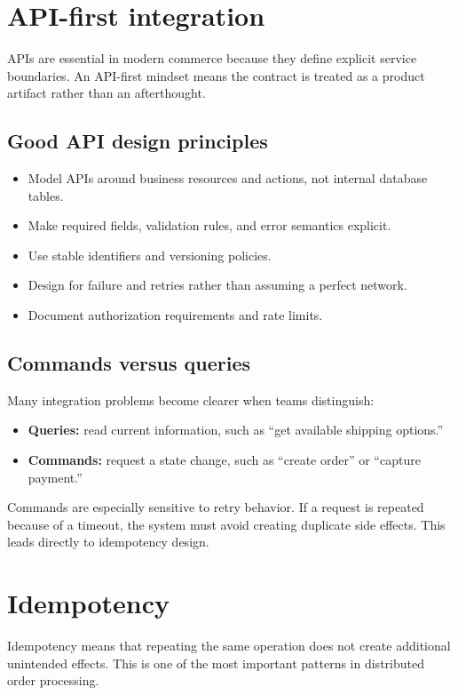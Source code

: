\section{API-first integration}
APIs are essential in modern commerce because they define explicit service boundaries.
An API-first mindset means the contract is treated as a product artifact rather than an afterthought.

\subsection{Good API design principles}
\begin{itemize}
  \item Model APIs around business resources and actions, not internal database tables.
  \item Make required fields, validation rules, and error semantics explicit.
  \item Use stable identifiers and versioning policies.
  \item Design for failure and retries rather than assuming a perfect network.
  \item Document authorization requirements and rate limits.
\end{itemize}

\subsection{Commands versus queries}
Many integration problems become clearer when teams distinguish:
\begin{itemize}
  \item \textbf{Queries:} read current information, such as ``get available shipping options.''
  \item \textbf{Commands:} request a state change, such as ``create order'' or ``capture payment.''
\end{itemize}

Commands are especially sensitive to retry behavior.
If a request is repeated because of a timeout, the system must avoid creating duplicate side effects.
This leads directly to idempotency design.

\section{Idempotency}
Idempotency means that repeating the same operation does not create additional unintended effects.
This is one of the most important patterns in distributed order processing.

